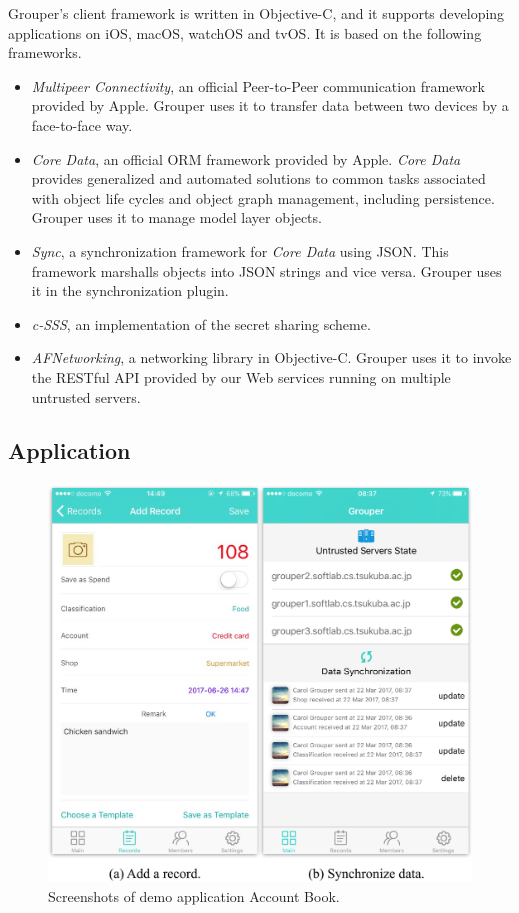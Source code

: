 \documentclass[twocolumn,10pt]{article}
\begin{document}
Grouper's client framework is written in Objective-C, and it supports developing applications on iOS, macOS, watchOS and tvOS.
It is based on the following frameworks.   

\begin{itemize}
	\setlength{\itemsep}{1pt}
	\setlength{\parskip}{0pt}
	\setlength{\parsep}{0pt}
	\item 
	\emph{Multipeer Connectivity}\cite{mc},  an official Peer-to-Peer communication framework provided by Apple. 
	Grouper uses it to transfer data between two devices by a face-to-face way.
	\item 
	\emph{Core Data}\cite{coredata}, an official ORM framework provided by Apple.
	\emph{Core Data} provides generalized and automated solutions to common tasks associated with object life cycles and object graph management, including persistence. 
	Grouper uses it to manage model layer objects. 
	\item 
	\emph{Sync}, a synchronization framework for \emph{Core Data} using JSON. 
	This framework marshalls objects into JSON strings and vice versa. 
	Grouper uses it in the synchronization plugin.
	\item 
	\emph{c-SSS}\cite{c-sss}, an implementation of the secret sharing scheme.
	\item 
	\emph{AFNetworking}\cite{afnetworking}, a networking library in Objective-C. 
	Grouper uses it to invoke the RESTful API provided by our Web services running on multiple untrusted servers. 
\end{itemize}

\subsection{Application}

\begin{figure}[t]
	\centering
	\includegraphics[scale=0.5]{account_book}
	\caption{Screenshots of demo application Account Book.}
\end{figure}
\end{document}
